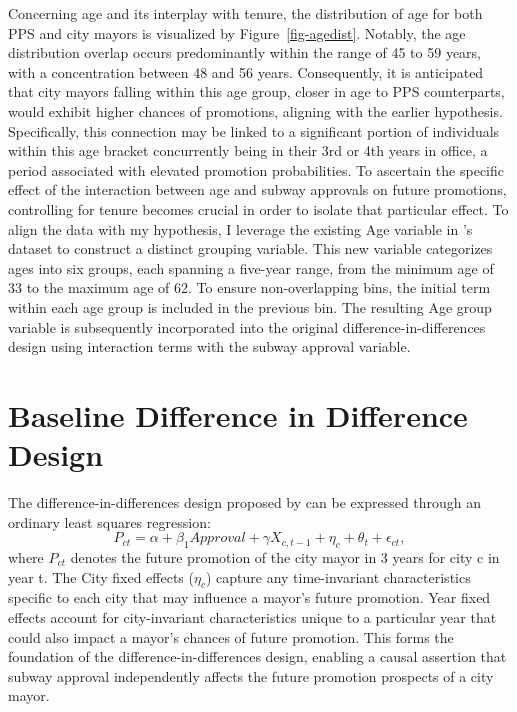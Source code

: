 \documentclass[12pt, ]{article}
\begin{document}
Concerning age and its interplay with tenure, the distribution of age
for both PPS and city mayors is visualized by Figure~\ref{fig-agedist}.
Notably, the age distribution overlap occurs predominantly within the
range of 45 to 59 years, with a concentration between 48 and 56 years.
Consequently, it is anticipated that city mayors falling within this age
group, closer in age to PPS counterparts, would exhibit higher chances
of promotions, aligning with the earlier hypothesis. Specifically, this
connection may be linked to a significant portion of individuals within
this age bracket concurrently being in their 3rd or 4th years in office,
a period associated with elevated promotion probabilities. To ascertain
the specific effect of the interaction between age and subway approvals
on future promotions, controlling for tenure becomes crucial in order to
isolate that particular effect. To align the data with my hypothesis, I
leverage the existing Age variable in \citet{lei2022private}'s dataset
to construct a distinct grouping variable. This new variable categorizes
ages into six groups, each spanning a five-year range, from the minimum
age of 33 to the maximum age of 62. To ensure non-overlapping bins, the
initial term within each age group is included in the previous bin. The
resulting Age group variable is subsequently incorporated into the
original difference-in-differences design using interaction terms with
the subway approval variable.

\hypertarget{baseline-difference-in-difference-design}{%
\section{Baseline Difference in Difference
Design}\label{baseline-difference-in-difference-design}}

The difference-in-differences design proposed by \citet{lei2022private}
can be expressed through an ordinary least squares regression:
\[P_{ct} = \alpha + \beta_{1}Approval + \gamma X_{c,t - 1} + \eta_{c} + \theta_{t} + \epsilon_{ct},\]
where \(P_{ct}\) denotes the future promotion of the city mayor in 3
years for city c in year t. The City fixed effects (\(\eta_{c}\))
capture any time-invariant characteristics specific to each city that
may influence a mayor's future promotion. Year fixed effects account for
city-invariant characteristics unique to a particular year that could
also impact a mayor's chances of future promotion. This forms the
foundation of the difference-in-differences design, enabling a causal
assertion that subway approval independently affects the future
promotion prospects of a city mayor.
\end{document}
